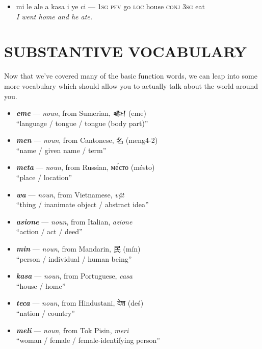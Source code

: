 \documentclass[a4paper, titlepage]{article}
\begin{document}
\begin{itemize}
	\begin{itemize}
		\item mi le ale a kasa i ye ci — \textsc{1sg pfv} go \textsc{loc} house \textsc{conj 3sg} eat \\\textit{I went home and he ate.}
	\end{itemize}
\end{itemize}

\section{SUBSTANTIVE VOCABULARY}

Now that we've covered many of the basic function words, we can leap into some more vocabulary which should allow you to actually talk about the world around you.

\begin{itemize}
	\item \textbf{\textit{eme}} — \textit{noun}, from Sumerian, {\cuneiffont 𒅴} (eme) \\``language / tongue / tongue (body part)''
	\item \textbf{\textit{men}} — \textit{noun}, from Cantonese, 名 (meng4-2) \\``name / given name / term''
	\item \textbf{\textit{meta}} — \textit{noun}, from Russian, ме́сто (mésto) \\``place / location''
	\item \textbf{\textit{wa}} — \textit{noun}, from Vietnamese, \textit{vật} \\``thing / inanimate object / abstract idea''
	\item \textbf{\textit{asione}} — \textit{noun}, from Italian, \textit{azione} \\``action / act / deed''
	\item \textbf{\textit{min}} — \textit{noun}, from Mandarin, 民 (mín) \\``person / individual / human being''
	\item \textbf{\textit{kasa}} — \textit{noun}, from Portuguese, \textit{casa} \\``house / home''
	\item \textbf{\textit{teca}} — \textit{noun}, from Hindustani, {\hmfont देश} (deś) \\``nation / country''
	\item \textbf{\textit{meli}} — \textit{noun}, from Tok Pisin, \textit{meri} \\``woman / female / female-identifying person''

\end{itemize}
\end{document}
